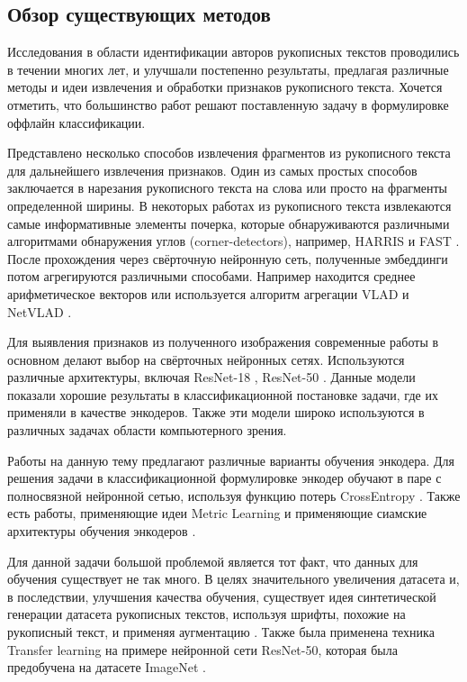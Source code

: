 \subsection{Обзор существующих методов}
    Исследования в области идентификации авторов рукописных текстов проводились в течении многих лет, и улучшали постепенно результаты, предлагая различные методы и идеи извлечения и обработки признаков рукописного текста. Хочется отметить, что большинство работ решают поставленную задачу в формулировке оффлайн классификации.
    
    Представлено несколько способов извлечения фрагментов из рукописного текста для дальнейшего извлечения признаков. Один из самых простых способов заключается в нарезания рукописного текста на слова или просто на фрагменты определенной ширины. В некоторых работах из рукописного текста извлекаются самые информативные элементы почерка, которые обнаруживаются различными алгоритмами обнаружения углов (corner-detectors), например, HARRIS и FAST \cite{corner_detector}. После прохождения через свёрточную нейронную сеть, полученные эмбеддинги потом агрегируются различными способами. Например находится среднее арифметическое векторов \cite{china} или используется алгоритм агрегации VLAD \cite{vlad} и NetVLAD \cite{netvlad}. 

    Для выявления признаков из полученного изображения современные работы в основном делают выбор на свёрточных нейронных сетях. Используются различные архитектуры, включая ResNet-18 \cite{font}, ResNet-50 \cite{vlad}. Данные модели показали хорошие результаты в классификационной постановке задачи, где их применяли в качестве энкодеров. Также эти модели широко используются в различных задачах области компьютерного зрения.

    Работы на данную тему предлагают различные варианты обучения энкодера. Для решения задачи в классификационной формулировке энкодер обучают в паре с полносвязной нейронной сетью, используя функцию потерь CrossEntropy \cite{font} \cite{china}. Также есть работы, применяющие идеи Metric Learning и применяющие сиамские архитектуры обучения энкодеров \cite{snn}.

    Для данной задачи большой проблемой является тот факт, что данных для обучения существует не так много. В целях значительного увеличения датасета и, в последствии, улучшения качества обучения, существует идея синтетической генерации датасета рукописных текстов, используя шрифты, похожие на рукописный текст, и применяя аугментацию \cite{font}. Также была применена техника Transfer learning на примере нейронной сети ResNet-50, которая была предобучена на датасете ImageNet \cite{vlad}.

